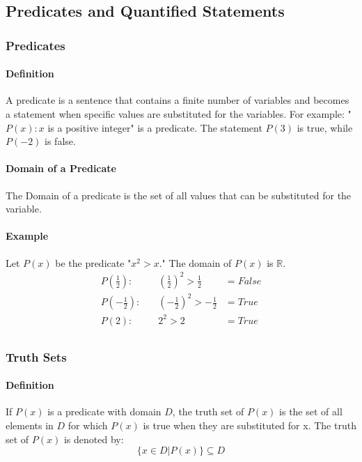 \subsection{Predicates and Quantified Statements}
\hrulefill

\subsubsection*{Predicates}
\paragraph*{Definition}
A predicate is a sentence that contains a finite number of variables and becomes
a statement when specific values are substituted for the variables. For example: 
"$P(x): x$ is a positive integer" is a predicate. The statement $P(3)$ is true, while $P(-2)$ is false.

\paragraph*{Domain of a Predicate}
The Domain of a predicate is the set of all values that can be substituted for the
variable.

\paragraph*{Example}
Let $P(x)$ be the predicate "$x^2 > x$." The domain of $P(x)$ is $\mathbb{R}$.
\begin{align*}
    P(\frac{1}{2}): &\quad (\frac{1}{2})^2 > \frac{1}{2} &= False\\
    P(-\frac{1}{2}): &\quad (-\frac{1}{2})^2 > -\frac{1}{2} &= True\\
    P(2): &\quad 2^2 > 2 &= True\\
\end{align*}

\subsubsection*{Truth Sets}
\paragraph*{Definition}
If $P(x)$ is a predicate with domain $D$, the truth set of $P(x)$ is the set of all
elements in $D$ for which $P(x)$ is true when they are substituted for x. The truth 
set of $P(x)$ is denoted by:
\begin{equation*}
    \{x \in D | P(x)\} \subseteq D
\end{equation*}


